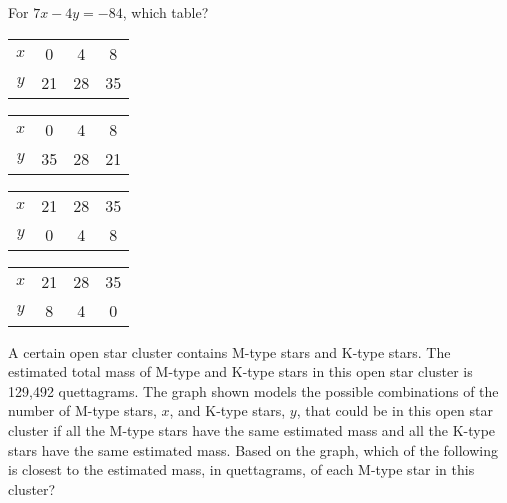 \documentclass[12pt]{exam}
\begin{document}
\begin{questions}
\begin{center}
\end{center}

\question For $7x - 4y = -84$, which table?
\begin{choices}
\choice 
    \begin{tabular}{|c|c|c|c|}
    \hline
    $x$ & 0 & 4 & 8 \\
    $y$ & 21 & 28 & 35 \\
    \hline
    \end{tabular}
\choice 
    \begin{tabular}{|c|c|c|c|}
    \hline
    $x$ & 0 & 4 & 8 \\
    $y$ & 35 & 28 & 21 \\
    \hline
    \end{tabular}
\choice 
    \begin{tabular}{|c|c|c|c|}
    \hline
    $x$ & 21 & 28 & 35 \\
    $y$ & 0 & 4 & 8 \\
    \hline
    \end{tabular}
\choice 
    \begin{tabular}{|c|c|c|c|}
    \hline
    $x$ & 21 & 28 & 35 \\
    $y$ & 8 & 4 & 0 \\
    \hline
    \end{tabular}
\end{choices}

\question A certain open star cluster contains M-type stars and K-type stars. The estimated total mass of M-type and K-type stars in this open star cluster is 129{,}492 quettagrams. The graph shown models the possible combinations of the number of M-type stars, $x$, and K-type stars, $y$, that could be in this open star cluster if all the M-type stars have the same estimated mass and all the K-type stars have the same estimated mass. Based on the graph, which of the following is closest to the estimated mass, in quettagrams, of each M-type star in this cluster?


\end{questions}
\end{document}
